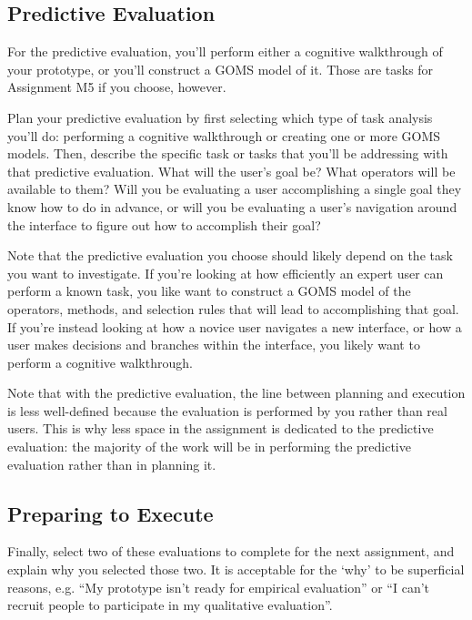 \documentclass[12pt,letterpaper]{article}
\begin{document}
\subsection*{Predictive Evaluation}

For the predictive evaluation, you’ll perform either a cognitive walkthrough of your prototype, or you’ll construct a GOMS model of it. Those are tasks for Assignment M5 if you choose, however.

Plan your predictive evaluation by first selecting which type of task analysis you’ll do: performing a cognitive walkthrough or creating one or more GOMS models. Then, describe the specific task or tasks that you’ll be addressing with that predictive evaluation. What will the user’s goal be? What operators will be available to them? Will you be evaluating a user accomplishing a single goal they know how to do in advance, or will you be evaluating a user’s navigation around the interface to figure out how to accomplish their goal?

Note that the predictive evaluation you choose should likely depend on the task you want to investigate. If you’re looking at how efficiently an expert user can perform a known task, you like want to construct a GOMS model of the operators, methods, and selection rules that will lead to accomplishing that goal. If you’re instead looking at how a novice user navigates a new interface, or how a user makes decisions and branches within the interface, you likely want to perform a cognitive walkthrough.

Note that with the predictive evaluation, the line between planning and execution is less well-defined because the evaluation is performed by you rather than real users. This is why less space in the assignment is dedicated to the predictive evaluation: the majority of the work will be in performing the predictive evaluation rather than in planning it.

\subsection*{Preparing to Execute}

Finally, select two of these evaluations to complete for the next assignment, and explain why you selected those two. It is acceptable for the ‘why’ to be superficial reasons, e.g. “My prototype isn’t ready for empirical evaluation” or “I can’t recruit people to participate in my qualitative evaluation”.

 

\end{document}

